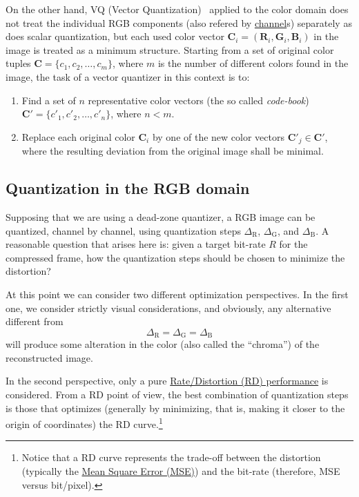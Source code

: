On the other hand, VQ (Vector
Quantization)~\cite{vruiz__vector_quantization} applied to the color
domain does not treat the individual RGB components (also refered by
\href{https://en.wikipedia.org/wiki/Color_image}{channel}s) separately
as does scalar quantization, but each used color vector ${\mathbf C}_i
= ({\mathbf R}_i, {\mathbf G}_i, {\mathbf B}_i )$ in the image is
treated as a minimum structure. Starting from a set of original color
tuples ${\mathbf C} = \{c_1, c_2, \ldots ,c_m\}$, where $m$ is the
number of different colors found in the image, the task of a vector
quantizer in this context is to:
\begin{enumerate}
\item Find a set of $n$ representative color vectors (the so called
  \emph{code-book}) ${\mathbf C}' = \{c'_1, c'_2 ,\ldots , c'_n
  \}$, where $n < m$.
\item Replace each original color ${\mathbf C}_i$ by one of the new
  color vectors ${\mathbf C}'_j\in {\mathbf C}'$, where the resulting
  deviation from the original image shall be minimal.
\end{enumerate}


\subsection{Quantization in the RGB domain}

Supposing that we are using a dead-zone quantizer, a RGB image
can be quantized, channel by channel, using quantization steps
$\Delta_{\text{R}}$, $\Delta_{\text{G}}$, and $\Delta_{\text{B}}$. A
reasonable question that arises here is: given a target bit-rate $R$
for the compressed frame, how the quantization steps should be chosen
to minimize the distortion?

At this point we can consider two different optimization
perspectives. In the first one, we consider strictly visual
considerations, and obviously, any alternative different from
\begin{equation}
  \Delta_{\text{R}} = \Delta_{\text{G}} = \Delta_{\text{B}}
  \label{eq:simple_Q}
\end{equation}
will produce some alteration in the color (also called the
``chroma'') of the reconstructed image.

In the second perspective, only a pure
\href{https://en.wikipedia.org/wiki/Rate-distortion_theory}{Rate/Distortion
  (RD) performance} is considered. From a RD point of view, the best
combination of quantization steps is those that optimizes (generally
by minimizing, that is, making it closer to the origin of coordinates)
the RD curve.\footnote{Notice that a RD curve represents the trade-off
between the distortion (typically the
\href{https://en.wikipedia.org/wiki/Root-mean-square_deviation}{Mean Square Error (MSE)}) and the bit-rate (therefore, MSE versus
bit/pixel).}

